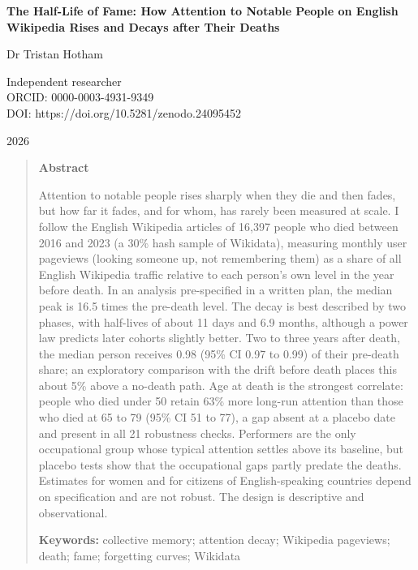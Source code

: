 \documentclass[11pt,a4paper]{article}
\begin{document}
\begin{center}
{\Large\bfseries The Half-Life of Fame: How Attention to Notable People on English Wikipedia Rises and Decays after Their Deaths\par}
\vspace{1.2em}
{\large Dr Tristan Hotham\par}
\vspace{0.3em}
{\small Independent researcher\\
ORCID: 0000-0003-4931-9349\\
DOI: https://doi.org/10.5281/zenodo.24095452\par}
\vspace{0.8em}
2026
\end{center}

\begin{quote}
\small
\begin{center}\textbf{Abstract}\end{center}
Attention to notable people rises sharply when they die and then fades, but how far it fades, and for whom, has rarely been measured at scale. I follow the English Wikipedia articles of 16,397 people who died between 2016 and 2023 (a 30\% hash sample of Wikidata), measuring monthly user pageviews (looking someone up, not remembering them) as a share of all English Wikipedia traffic relative to each person's own level in the year before death. In an analysis pre-specified in a written plan, the median peak is 16.5 times the pre-death level. The decay is best described by two phases, with half-lives of about 11 days and 6.9 months, although a power law predicts later cohorts slightly better. Two to three years after death, the median person receives 0.98 (95\% CI 0.97 to 0.99) of their pre-death share; an exploratory comparison with the drift before death places this about 5\% above a no-death path. Age at death is the strongest correlate: people who died under 50 retain 63\% more long-run attention than those who died at 65 to 79 (95\% CI 51 to 77), a gap absent at a placebo date and present in all 21 robustness checks. Performers are the only occupational group whose typical attention settles above its baseline, but placebo tests show that the occupational gaps partly predate the deaths. Estimates for women and for citizens of English-speaking countries depend on specification and are not robust. The design is descriptive and observational.

\textbf{Keywords:} collective memory; attention decay; Wikipedia pageviews; death; fame; forgetting curves; Wikidata
\end{quote}
\end{document}
